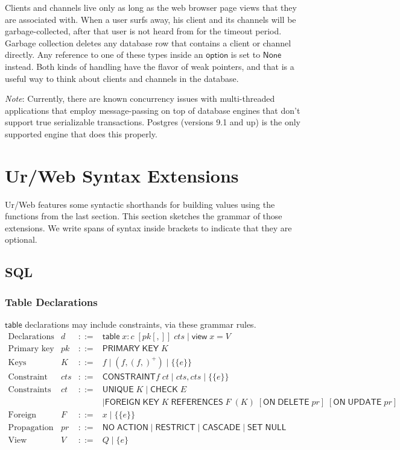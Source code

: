 \documentclass{article}
\newcommand{\mt}[1]{\mathsf{#1}}
\begin{document}
Clients and channels live only as long as the web browser page views that they are associated with.  When a user surfs away, his client and its channels will be garbage-collected, after that user is not heard from for the timeout period.  Garbage collection deletes any database row that contains a client or channel directly.  Any reference to one of these types inside an $\mt{option}$ is set to $\mt{None}$ instead.  Both kinds of handling have the flavor of weak pointers, and that is a useful way to think about clients and channels in the database.

\emph{Note}: Currently, there are known concurrency issues with multi-threaded applications that employ message-passing on top of database engines that don't support true serializable transactions.  Postgres (versions 9.1 and up) is the only supported engine that does this properly.


\section{Ur/Web Syntax Extensions}

Ur/Web features some syntactic shorthands for building values using the functions from the last section.  This section sketches the grammar of those extensions.  We write spans of syntax inside brackets to indicate that they are optional.

\subsection{SQL}

\subsubsection{\label{tables}Table Declarations}

$\mt{table}$ declarations may include constraints, via these grammar rules.
$$\begin{array}{rrcll}
  \textrm{Declarations} & d &::=& \mt{table} \; x : c \; [pk[,]] \; cts \mid \mt{view} \; x = V \\
  \textrm{Primary key constraints} & pk &::=& \mt{PRIMARY} \; \mt{KEY} \; K \\
  \textrm{Keys} & K &::=& f \mid (f, (f,)^+) \mid \{\{e\}\} \\
  \textrm{Constraint sets} & cts &::=& \mt{CONSTRAINT} f \; ct \mid cts, cts \mid \{\{e\}\} \\
  \textrm{Constraints} & ct &::=& \mt{UNIQUE} \; K \mid \mt{CHECK} \; E \\
  &&& \mid \mt{FOREIGN} \; \mt{KEY} \; K \; \mt{REFERENCES} \; F \; (K) \; [\mt{ON} \; \mt{DELETE} \; pr] \; [\mt{ON} \; \mt{UPDATE} \; pr] \\
  \textrm{Foreign tables} & F &::=& x \mid \{\{e\}\} \\
  \textrm{Propagation modes} & pr &::=& \mt{NO} \; \mt{ACTION} \mid \mt{RESTRICT} \mid \mt{CASCADE} \mid \mt{SET} \; \mt{NULL} \\
  \textrm{View expressions} & V &::=& Q \mid \{e\}
\end{array}$$
\end{document}
